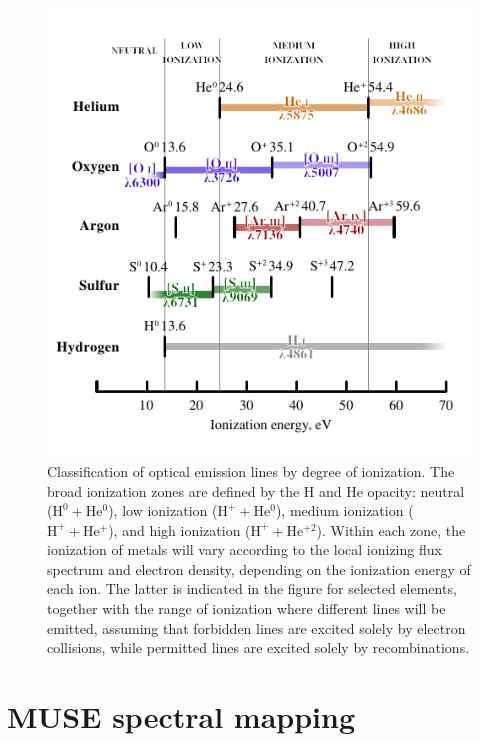 \documentclass[useAMS, usenatbib, a4paper]{mnras}
\newcommand*\chem[1]{\ensuremath{\mathrm{#1}}}
\begin{document}
\begin{figure}
  \centering
  \includegraphics{figs/ionization-potential-table}
  \caption{
    Classification of optical emission lines by degree of ionization.
    The broad ionization zones are defined by the H and He opacity:
    neutral (\(\chem{H^0} + \chem{He^0}\)),
    low ionization (\(\chem{H^+} + \chem{He^0}\)),
    medium ionization (\(\chem{H^+} + \chem{He^+}\)),
    and high ionization (\(\chem{H^+} + \chem{He^{+2}}\)).
    Within each zone, the ionization of metals will
    vary according to the local ionizing flux spectrum
    and electron density,
    depending on the ionization energy of each ion.
    The latter is indicated in the figure for selected elements,
    together with the range of ionization where different lines
    will be emitted, assuming that forbidden lines
    are excited solely by electron collisions,
    while permitted lines are excited solely by recombinations.
   }
  \label{fig:ion-energies}
\end{figure}

\section{MUSE spectral mapping}
\label{sec:observations}
\end{document}
